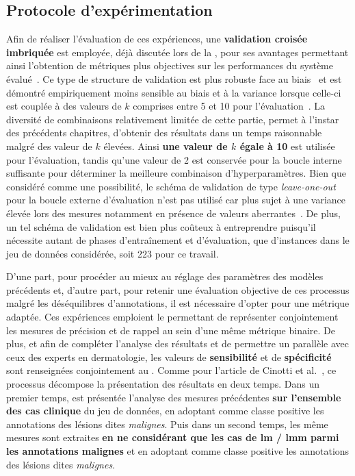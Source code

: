 \subsection{Protocole d'expérimentation}
Afin de réaliser l'évaluation de ces expériences, une \textbf{validation croisée imbriquée} est employée, déjà discutée lors de la , pour ses avantages permettant ainsi l'obtention de métriques plus objectives sur les performances du système évalué~\cite{Cawley2010}. Ce type de structure de validation est plus robuste face au biais~\cite{Cawley2010} et est démontré empiriquement moins sensible au biais et à la variance lorsque celle-ci est couplée à des valeurs de $k$ comprises entre 5 et 10 pour l'évaluation~\cite{James2000}. La diversité de combinaisons relativement limitée de cette partie, permet à l'instar des précédents chapitres, d'obtenir des résultats dans un temps raisonnable malgré des valeur de $k$ élevées. Ainsi \textbf{une valeur de $k$ égale à 10} est utilisée pour l'évaluation, tandis qu'une valeur de 2 est conservée pour la boucle interne suffisante pour déterminer la meilleure combinaison d'hyperparamètres. Bien que considéré comme une possibilité, le schéma de validation de type \textit{leave-one-out} pour la boucle externe d'évaluation n'est pas utilisé car plus sujet à une variance élevée lors des mesures notamment en présence de valeurs aberrantes~\cite{Bengio2004}. De plus, un tel schéma de validation est bien plus coûteux à entreprendre puisqu'il nécessite autant de phases d'entraînement et d'évaluation, que d'instances dans le jeu de données considérée, soit 223 pour ce travail.\par

D'une part, pour procéder au mieux au réglage des paramètres des modèles précédents et, d'autre part, pour retenir une évaluation objective de ces processus malgré les déséquilibres d'annotations, il est nécessaire d'opter pour une métrique adaptée. Ces expériences emploient le \textbf{\fscore{}} permettant de représenter conjointement les mesures de précision et de rappel au sein d'une même métrique binaire. De plus, et afin de compléter l'analyse des résultats et de permettre un parallèle avec ceux des experts en dermatologie, les valeurs de \textbf{sensibilité} et de \textbf{spécificité} sont renseignées conjointement au \fscore{}. Comme pour l'article de Cinotti et al.~\cite{Cinotti2016}, ce processus décompose la présentation des résultats en deux temps. Dans un premier temps, est présentée l'analyse des mesures précédentes \textbf{sur l'ensemble des cas clinique} du jeu de données, en adoptant comme classe positive les annotations des lésions dites \textit{malignes}. Puis dans un second temps, les même mesures sont extraites \textbf{en ne considérant que les cas de \textbf{\gls{lm} / \gls{lmm}} parmi les annotations malignes} et en adoptant comme classe positive les annotations des lésions dites \textit{malignes}.\par


